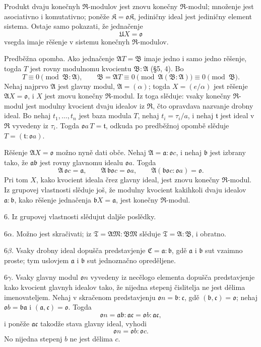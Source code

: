 \documentclass[11pt]{article}
\providecommand{\mR}{\mathfrak{R}}
\providecommand{\mK}{\mathfrak{K}}
\providecommand{\ma}{\mathfrak{a}}
\providecommand{\mb}{\mathfrak{b}}
\providecommand{\mc}{\mathfrak{c}}
\providecommand{\mo}{\mathfrak{o}}
\providecommand{\mt}{\mathfrak{t}}
\begin{document}
Produkt dvaju konečnyh $\mR$-modulov jest znovu konečny $\mR$-modul; množenje jest asociativno i komutativno; poněže $\mK=\mo\mK$, jediničny ideal jest jediničny element sistema. Ostaje samo pokazati, že jednačenje
\[
        \mathfrak U X=\mo
\]
vsegda imaje rěšenje v sistemu konečnyh $\mR$-modulov.

Predběžna opomba. Ako jednačenje $\mathfrak A T=\mathfrak B$ imaje jedno i samo jedno rěšenje, togda $T$ jest rovny modulnomu kvocientu $\mathfrak B:\mathfrak A$ (§5, 4). Bo
\[
        T\equiv0\pmod{\mathfrak B:\mathfrak A},
        \qquad
        \mathfrak B=\mathfrak A T\equiv0\pmod{\mathfrak A(\mathfrak B:\mathfrak A)}\equiv0\pmod{\mathfrak B}.
\]
Nehaj najprvo $\mathfrak A$ jest glavny modul, $\mathfrak A=(\alpha)$; togda $X=(e/\alpha)$ jest rěšenje $\mathfrak A X=\mo$, i $X$ jest znovu konečny $\mR$-modul. Iz toga slěduje: vsaky konečny $\mR$-modul jest modulny kvocient dvaju idealov iz $\mR$, čto opravdava nazvanje drobny ideal. Bo nehaj $t_1,\ldots,t_n$ jest baza modula $T$, nehaj $t_i=\tau_i/a$, i nehaj $\mt$ jest ideal v $\mR$ vyvedeny iz $\tau_i$. Togda $\mo a\,T=\mt$, odkuda po predběžnoj opombě slěduje $T=(\mt:\mo a)$.

Rěšenje $\mathfrak A X=\mo$ možno nyně dati obče. Nehaj $\mathfrak A=\ma:\mo c$, i nehaj $\mb$ jest izbrany tako, že $\ma\mb$ jest rovny glavnomu idealu $\mo a$. Togda
\[
        \mathfrak A\,\mo c=\ma,
        \qquad \mathfrak A\,\mb\mo c=\mo a,
        \qquad \mathfrak A(\mb\mo c:\mo a)=\mo.
\]
Pri tom $X$, kako kvocient ideala črez glavny ideal, jest znovu konečny $\mR$-modul. Iz grupovej vlastnosti slěduje još, že modulny kvocient kakihkoli dvaju idealov $\ma:\mb$, kako rěšenje jednačenja $\mb X=\ma$, jest konečny $\mR$-modul.

6. Iz grupovej vlastnosti slědujut daljše poslědky.

6$\alpha$. Možno jest skračivati; iz $\mathfrak T=\mathfrak A\mathfrak M:\mathfrak B\mathfrak M$ slěduje $\mathfrak T=\mathfrak A:\mathfrak B$, i obratno.

6$\beta$. Vsaky drobny ideal dopušča predstavjenje $\mathfrak C=\ma:\mb$, gdě $\ma$ i $\mb$ sut vzaimno proste; tym uslovjem $\ma$ i $\mb$ sut jednoznačno opreděljene.

6$\gamma$. Vsaky glavny modul $\mo n$ vyvedeny iz necělogo elementa dopušča predstavjenje kako kvocient glavnyh idealov tako, že nijedna stepenj čislitelja ne jest dělima imenovateljem. Nehaj v skračenom predstavjenju $\mo n=\mb:\mc$, gdě $(\mb,\mc)=\mo$; nehaj $\mo b=\mb\ma$ i $(\ma,\mc)=\mo$. Togda
\[
        \mo n=\ma\mb:\ma\mc=\mo b:\ma\mc,
\]
i poněže $\ma\mc$ takodže stava glavny ideal, vyhodi
\[
        \mo n=\mo b:\mo c.
\]
No nijedna stepenj $b$ ne jest dělima $c$.
\end{document}
